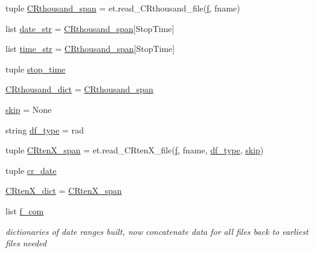 \begin{DoxyCompactItemize}
tuple \hyperlink{namespace_preprocess_01_d_r_a6d31701846ffc5afde0480e8237a7cf3}{C\+Rthousand\+\_\+span} = et.\+read\+\_\+\+C\+Rthousand\+\_\+file(\hyperlink{namespace_preprocess_01_d_r_a42c175efe72eeb61c918cffc912baa69}{f}, fname)
\item 
list \hyperlink{namespace_preprocess_01_d_r_a5dd9db5e04103125b0e1a71ee37e106b}{date\+\_\+str} = \hyperlink{namespace_preprocess_01_d_r_a6d31701846ffc5afde0480e8237a7cf3}{C\+Rthousand\+\_\+span}\mbox{[}\textquotesingle{}Stop\+Time\textquotesingle{}\mbox{]}
\item 
list \hyperlink{namespace_preprocess_01_d_r_afe9443eef87a2a031c1106acc31cb166}{time\+\_\+str} = \hyperlink{namespace_preprocess_01_d_r_a6d31701846ffc5afde0480e8237a7cf3}{C\+Rthousand\+\_\+span}\mbox{[}\textquotesingle{}Stop\+Time\textquotesingle{}\mbox{]}
\item 
tuple \hyperlink{namespace_preprocess_01_d_r_a026e495ab57bb5f630a98c27cf13c1aa}{stop\+\_\+time}
\item 
\hyperlink{namespace_preprocess_01_d_r_a5972ec24a3edf386f881a64fc2e47ed5}{C\+Rthousand\+\_\+dict} = \hyperlink{namespace_preprocess_01_d_r_a6d31701846ffc5afde0480e8237a7cf3}{C\+Rthousand\+\_\+span}
\item 
\hyperlink{namespace_preprocess_01_d_r_a28a0d49fbacac27b8de4fd609043b742}{skip} = None
\item 
string \hyperlink{namespace_preprocess_01_d_r_a8179dd2e8d60a0dc3d9dff36cc8ea97e}{df\+\_\+type} = \textquotesingle{}rad\textquotesingle{}
\item 
tuple \hyperlink{namespace_preprocess_01_d_r_a9c3f672064dcd45d53eb354141ad8dde}{C\+Rten\+X\+\_\+span} = et.\+read\+\_\+\+C\+Rten\+X\+\_\+file(\hyperlink{namespace_preprocess_01_d_r_a42c175efe72eeb61c918cffc912baa69}{f}, fname, \hyperlink{namespace_preprocess_01_d_r_a8179dd2e8d60a0dc3d9dff36cc8ea97e}{df\+\_\+type}, \hyperlink{namespace_preprocess_01_d_r_a28a0d49fbacac27b8de4fd609043b742}{skip})
\item 
tuple \hyperlink{namespace_preprocess_01_d_r_a5924b2b745d8569255d35551891b9b4f}{cr\+\_\+date}
\item 
\hyperlink{namespace_preprocess_01_d_r_a1f133b54c3941799c8821d6d7b6a5d9c}{C\+Rten\+X\+\_\+dict} = \hyperlink{namespace_preprocess_01_d_r_a9c3f672064dcd45d53eb354141ad8dde}{C\+Rten\+X\+\_\+span}
\item 
list \hyperlink{namespace_preprocess_01_d_r_ac21cb069e78807e25e0ea127740544c8}{f\+\_\+com}
\begin{DoxyCompactList}\small\item\em dictionaries of date ranges built, now concatenate data for all files back to earliest files needed \end{DoxyCompactList}\item 

\end{DoxyCompactItemize}
